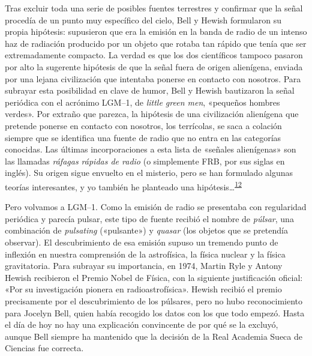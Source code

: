 Tras excluir toda una serie de posibles fuentes terrestres y confirmar que la señal procedía de un punto muy específico del cielo, Bell y Hewish formularon su propia hipótesis: supusieron que era la emisión en la banda de radio de un intenso haz de radiación producido por un objeto que rotaba tan rápido que tenía que ser extremadamente compacto. La verdad es que los dos científicos tampoco pasaron por alto la sugerente hipótesis de que la señal fuera de origen alienígena, enviada por una lejana civilización que intentaba ponerse en contacto con nosotros. Para subrayar esta posibilidad en clave de humor, Bell y Hewish bautizaron la señal periódica con el acrónimo LGM--1, de \emph{little green men}, «pequeños hombres verdes». Por extraño que parezca, la hipótesis de una civilización alienígena que pretende ponerse en contacto con nosotros, los terrícolas, se saca a colación siempre que se identifica una fuente de radio que no entra en las categorías conocidas. Las últimas incorporaciones a esta lista de «señales alienígenas» son las llamadas \emph{ráfagas rápidas de radio} (o simplemente FRB, por sus siglas en inglés). Su origen sigue envuelto en el misterio, pero se han formulado algunas teorías interesantes, y yo también he planteado una hipótesis…\textsuperscript{\hyperlink{note:05-12}{12}}

Pero volvamos a LGM--1. Como la emisión de radio se presentaba con regularidad periódica y parecía pulsar, este tipo de fuente recibió el nombre de \emph{púlsar}, una combinación de \emph{pulsating} («pulsante») y \emph{quasar} (los objetos que se pretendía observar). El descubrimiento de esa emisión supuso un tremendo punto de inflexión en nuestra comprensión de la astrofísica, la física nuclear y la física gravitatoria. Para subrayar su importancia, en 1974, Martin Ryle y Antony Hewish recibieron el Premio Nobel de Física, con la siguiente justificación oficial: «Por su investigación pionera en radioastrofísica». Hewish recibió el premio precisamente por el descubrimiento de los púlsares, pero no hubo reconocimiento para Jocelyn Bell, quien había recogido los datos con los que todo empezó. Hasta el día de hoy no hay una explicación convincente de por qué se la excluyó, aunque Bell siempre ha mantenido que la decisión de la Real Academia Sueca de Ciencias fue correcta.

